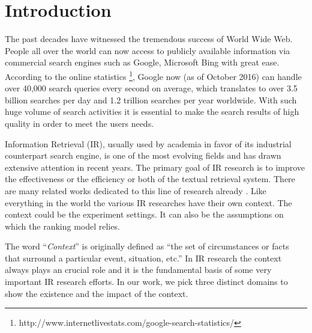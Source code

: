 %
%
\chapter{Introduction}
The past decades have witnessed the tremendous success of World Wide Web. 
People all over the world can now access to publicly available 
information via commercial search engines such as Google, Microsoft Bing 
with great ease. According to the online statistics 
\footnote{http://www.internetlivestats.com/google-search-statistics/}, 
Google now (as of October 2016) can handle over 40,000 search queries 
every second on average, which translates to over 3.5 billion searches 
per day and 1.2 trillion searches per year worldwide. 
With such huge volume of search activities it is essential to make the 
search results of high quality in order to meet the users needs.

Information Retrieval (IR), usually used by academia in favor of its 
industrial counterpart search engine, is one of the most evolving fields and 
has drawn extensive attention in recent years.
The primary goal of IR research is to improve the effectiveness or the 
efficiency or both of the textual retrieval system. 
There are many related works dedicated to this line of research already
\cite{Robertson96okapiat3,Singhal:1996:PDL:243199.243206,Zhai:2004:SSM:984321.984322,Fang:2005:EAA:1076034.1076116,Wu:2013:IAE:2484028.2484051,Liu2015}. 
Like everything in the world the various IR researches have their own 
context. The context could be the experiment settings. It can also be the 
assumptions on which the ranking model relies. 


The word ``\textit{Context}'' is originally defined as 
``the set of circumstances or facts that surround a particular event, situation, etc.'' 
In IR research the context always plays an crucial role and it is the 
fundamental basis of some very important IR research efforts. 
In our work, we pick three distinct domains to show the existence and 
the impact of the context.

